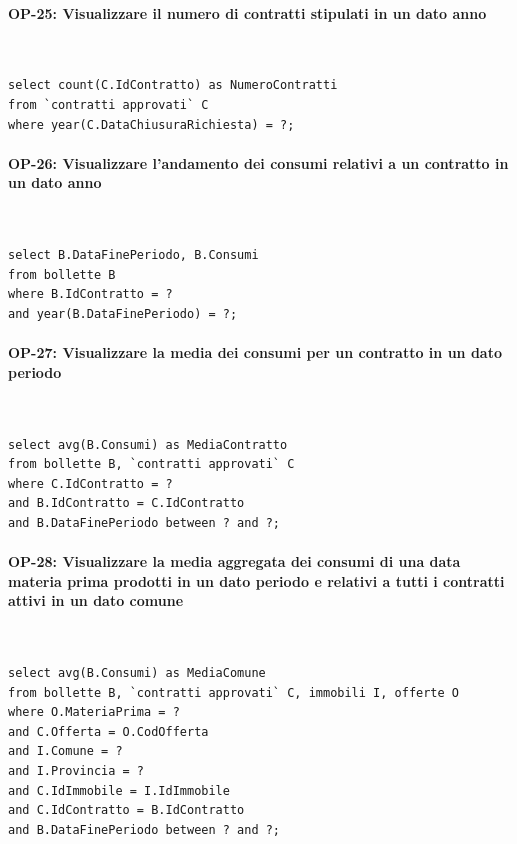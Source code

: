 \documentclass[a4paper,12pt]{report}
\begin{document}
\paragraph{OP-25: Visualizzare il numero di contratti stipulati in un dato anno}\mbox{}\\
\begin{lstlisting}
select count(C.IdContratto) as NumeroContratti
from `contratti approvati` C
where year(C.DataChiusuraRichiesta) = ?;
\end{lstlisting}

\paragraph{OP-26: Visualizzare l'andamento dei consumi relativi a un contratto in un dato anno}\mbox{}\\
\begin{lstlisting}
select B.DataFinePeriodo, B.Consumi
from bollette B
where B.IdContratto = ?
and year(B.DataFinePeriodo) = ?;
\end{lstlisting}

\paragraph{OP-27: Visualizzare la media dei consumi per un contratto in un dato periodo}\mbox{}\\
\begin{lstlisting}
select avg(B.Consumi) as MediaContratto
from bollette B, `contratti approvati` C
where C.IdContratto = ?
and B.IdContratto = C.IdContratto
and B.DataFinePeriodo between ? and ?;
\end{lstlisting}

\paragraph{OP-28: Visualizzare la media aggregata dei consumi di una data materia prima prodotti in un dato periodo e relativi a tutti i contratti attivi in un dato comune}\mbox{}\\
\begin{lstlisting}
select avg(B.Consumi) as MediaComune
from bollette B, `contratti approvati` C, immobili I, offerte O
where O.MateriaPrima = ?
and C.Offerta = O.CodOfferta
and I.Comune = ?
and I.Provincia = ?
and C.IdImmobile = I.IdImmobile
and C.IdContratto = B.IdContratto
and B.DataFinePeriodo between ? and ?;
\end{lstlisting}
\end{document}
